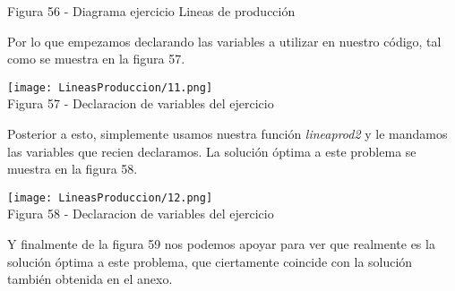 \documentclass[12pt,twoside]{article}
\begin{document}
\begin{center}
    Figura 56 - Diagrama ejercicio Lineas de producción
\end{center}
Por lo que empezamos declarando las variables a utilizar en nuestro código, tal como se muestra en la figura 57.
\begin{center}
    \texttt{[image: LineasProduccion/11.png]}\\
    Figura 57 - Declaracion de variables del ejercicio
\end{center}
Posterior a esto, simplemente usamos nuestra función \textit{lineaprod2} y le mandamos las variables que recien declaramos. La solución óptima a este problema se muestra en la figura 58.
\begin{center}
    \texttt{[image: LineasProduccion/12.png]}\\
    Figura 58 - Declaracion de variables del ejercicio
\end{center}
Y finalmente de la figura 59 nos podemos apoyar para ver que realmente es la solución óptima a este problema, que ciertamente coincide con la solución también obtenida en el anexo.
\end{document}
